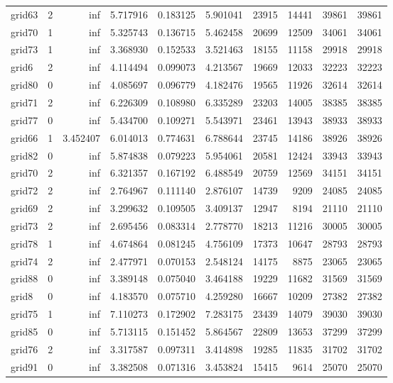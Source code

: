 \begin{longtable}{|l|r|r|r|r|r|r|r|r|r|}
grid63 & 2 & inf & 5.717916 & 0.183125 & 5.901041 & 23915 & 14441 & 39861 & 39861 \\
grid70 & 1 & inf & 5.325743 & 0.136715 & 5.462458 & 20699 & 12509 & 34061 & 34061 \\
grid73 & 1 & inf & 3.368930 & 0.152533 & 3.521463 & 18155 & 11158 & 29918 & 29918 \\
grid6 & 2 & inf & 4.114494 & 0.099073 & 4.213567 & 19669 & 12033 & 32223 & 32223 \\
grid80 & 0 & inf & 4.085697 & 0.096779 & 4.182476 & 19565 & 11926 & 32614 & 32614 \\
grid71 & 2 & inf & 6.226309 & 0.108980 & 6.335289 & 23203 & 14005 & 38385 & 38385 \\
grid77 & 0 & inf & 5.434700 & 0.109271 & 5.543971 & 23461 & 13943 & 38933 & 38933 \\
grid66 & 1 & 3.452407 & 6.014013 & 0.774631 & 6.788644 & 23745 & 14186 & 38926 & 38926 \\
grid82 & 0 & inf & 5.874838 & 0.079223 & 5.954061 & 20581 & 12424 & 33943 & 33943 \\
grid70 & 2 & inf & 6.321357 & 0.167192 & 6.488549 & 20759 & 12569 & 34151 & 34151 \\
grid72 & 2 & inf & 2.764967 & 0.111140 & 2.876107 & 14739 & 9209 & 24085 & 24085 \\
grid69 & 2 & inf & 3.299632 & 0.109505 & 3.409137 & 12947 & 8194 & 21110 & 21110 \\
grid73 & 2 & inf & 2.695456 & 0.083314 & 2.778770 & 18213 & 11216 & 30005 & 30005 \\
grid78 & 1 & inf & 4.674864 & 0.081245 & 4.756109 & 17373 & 10647 & 28793 & 28793 \\
grid74 & 2 & inf & 2.477971 & 0.070153 & 2.548124 & 14175 & 8875 & 23065 & 23065 \\
grid88 & 0 & inf & 3.389148 & 0.075040 & 3.464188 & 19229 & 11682 & 31569 & 31569 \\
grid8 & 0 & inf & 4.183570 & 0.075710 & 4.259280 & 16667 & 10209 & 27382 & 27382 \\
grid75 & 1 & inf & 7.110273 & 0.172902 & 7.283175 & 23439 & 14079 & 39030 & 39030 \\
grid85 & 0 & inf & 5.713115 & 0.151452 & 5.864567 & 22809 & 13653 & 37299 & 37299 \\
grid76 & 2 & inf & 3.317587 & 0.097311 & 3.414898 & 19285 & 11835 & 31702 & 31702 \\
grid91 & 0 & inf & 3.382508 & 0.071316 & 3.453824 & 15415 & 9614 & 25070 & 25070 \\

\end{longtable}

